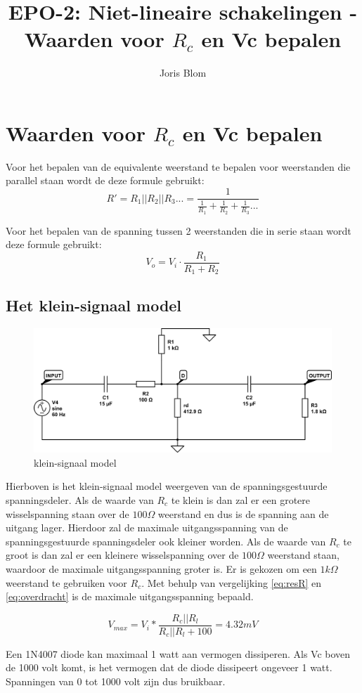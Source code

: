 \documentclass{report}
\title{EPO-2: Niet-lineaire schakelingen - Waarden voor $R_c$ en Vc bepalen}
\author{Joris Blom}
\begin{document}
\chapter{Waarden voor $R_c$ en Vc bepalen}
\label{ch:Waarden voor $R_c$ en Vc bepalen}
Voor het bepalen van de equivalente weerstand te bepalen voor weerstanden die parallel staan wordt de deze formule gebruikt:
\begin{equation}
\label{eq:resR}
R' = R_1||R_2||R_3... = \frac{1}{\frac{1}{R_1}+\frac{1}{R_2}+\frac{1}{R_3}...}
\end{equation}

\noindent Voor het bepalen van de spanning tussen 2 weerstanden die in serie staan wordt deze formule gebruikt:
\begin{equation}
\label{eq:overdracht}
V_o =V_i\cdot \frac{R_1}{R_1+R_2}
\end{equation}

\section{Het klein-signaal model}
\label{ch:Het klein-signaal model}
\begin{figure}[h]
\centering
\includegraphics[width=\textwidth]{kleinsignaalmodel.png}

\caption{klein-signaal model}
\end{figure}
Hierboven is het klein-signaal model weergeven van de spanningsgestuurde spanningsdeler. Als de waarde van $R_c$ te klein is dan zal er een grotere wisselspanning staan over de $100\Omega$ weerstand en dus is de spanning aan de uitgang lager. Hierdoor zal de maximale uitgangsspanning van de spanningsgestuurde spanningsdeler ook kleiner worden. Als de waarde van $R_c$ te groot is dan zal er een kleinere wisselspanning over de $100\Omega$ weerstand staan, waardoor de maximale uitgangsspanning groter is. Er is gekozen om een $1k\Omega$ weerstand te gebruiken voor $R_c$. Met behulp van vergelijking \ref{eq:resR} en \ref{eq:overdracht} is de maximale uitgangsspanning bepaald.


$$
\label{eq:maximaalVoltage}
V_{max} = V_i * \frac{R_c||R_l}{R_c||R_l + 100} = 4.32 mV
$$

Een 1N4007 diode kan maximaal 1 watt aan vermogen dissiperen. Als Vc boven de 1000 volt komt, is het vermogen dat de diode dissipeert ongeveer 1 watt. Spanningen van 0 tot 1000 volt zijn dus bruikbaar.
\end{document}
